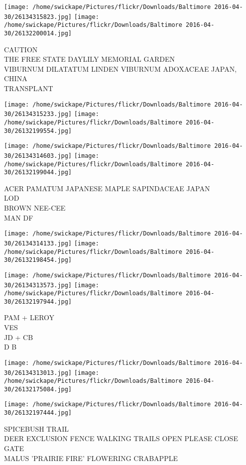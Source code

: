 \documentclass[10pt,letterpaper]{article}
\begin{document}
\texttt{[image: /home/swickape/Pictures/flickr/Downloads/Baltimore 2016-04-30/26134315823.jpg]}
\texttt{[image: /home/swickape/Pictures/flickr/Downloads/Baltimore 2016-04-30/26132200014.jpg]}

CAUTION\\
THE FREE STATE DAYLILY MEMORIAL GARDEN\\
VIBURNUM DILATATUM LINDEN VIBURNUM ADOXACEAE JAPAN, CHINA\\
TRANSPLANT
\pagebreak

\texttt{[image: /home/swickape/Pictures/flickr/Downloads/Baltimore 2016-04-30/26134315233.jpg]}
\texttt{[image: /home/swickape/Pictures/flickr/Downloads/Baltimore 2016-04-30/26132199554.jpg]}

\texttt{[image: /home/swickape/Pictures/flickr/Downloads/Baltimore 2016-04-30/26134314603.jpg]}
\texttt{[image: /home/swickape/Pictures/flickr/Downloads/Baltimore 2016-04-30/26132199044.jpg]}

ACER PAMATUM JAPANESE MAPLE SAPINDACEAE JAPAN\\
LOD\\
BROWN NEE{-}CEE\\
MAN DF
\pagebreak

\texttt{[image: /home/swickape/Pictures/flickr/Downloads/Baltimore 2016-04-30/26134314133.jpg]}
\texttt{[image: /home/swickape/Pictures/flickr/Downloads/Baltimore 2016-04-30/26132198454.jpg]}

\texttt{[image: /home/swickape/Pictures/flickr/Downloads/Baltimore 2016-04-30/26134313573.jpg]}
\texttt{[image: /home/swickape/Pictures/flickr/Downloads/Baltimore 2016-04-30/26132197944.jpg]}

PAM + LEROY\\
VES\\
JD + CB\\
D B
\pagebreak

\texttt{[image: /home/swickape/Pictures/flickr/Downloads/Baltimore 2016-04-30/26134313013.jpg]}
\texttt{[image: /home/swickape/Pictures/flickr/Downloads/Baltimore 2016-04-30/26132175084.jpg]}

\vspace{0.25in}
\texttt{[image: /home/swickape/Pictures/flickr/Downloads/Baltimore 2016-04-30/26132197444.jpg]}

SPICEBUSH TRAIL\\
DEER EXCLUSION FENCE WALKING TRAILS OPEN PLEASE CLOSE GATE\\
MALUS 'PRAIRIE FIRE' FLOWERING CRABAPPLE
\pagebreak
\end{document}

